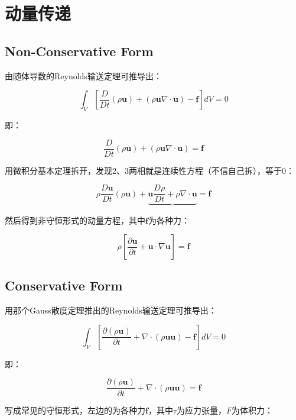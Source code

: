 \section{动量传递}
\subsection{Non-Conservative Form}
由随体导数的Reynolds输送定理可推导出：

\begin{equation}
\int_{V}\left[ \frac{D}{Dt}(\rho\bm{u}) + (\rho\bm{u}\nabla\cdot \bm{u}) - \bm{f} \right]dV = 0
\end{equation}

即：

\begin{equation}
\frac{D}{Dt}(\rho\bm{u}) + (\rho\bm{u}\nabla\cdot \bm{u}) = \bm{f}
\end{equation}

用微积分基本定理拆开，发现2、3两相就是连续性方程（不信自己拆），等于0：

\begin{equation}
\rho\frac{D\bm{u}}{Dt}(\rho\bm{u}) + \underbrace{ \bm{u}\frac{D\rho}{Dt} + \rho\nabla\cdot\bm{u} } = \bm{f}
\end{equation}

然后得到非守恒形式的动量方程，其中$ \bm{f} $为各种力：

\begin{equation}
\rho\left[ \frac{\partial \bm{u}}{\partial t} + \bm{u}\cdot\nabla\bm{u} \right] = \bm{f}
\end{equation}

\subsection{Conservative Form}
用那个Gauss散度定理推出的Reynolds输送定理可推导出：

\begin{equation}
\int_{V}\left[ \frac{\partial(\rho\bm{u})}{\partial t} + \nabla\cdot(\rho\bm{uu}) - \bm{f} \right]dV = 0
\end{equation}

即：

\begin{equation}
\frac{\partial(\rho\bm{u})}{\partial t} + \nabla\cdot(\rho\bm{uu}) = \bm{f}
\end{equation}

写成常见的守恒形式，左边的为各种力$ \bm{f} $，其中$ \tau $为应力张量，$ F $为体积力：


